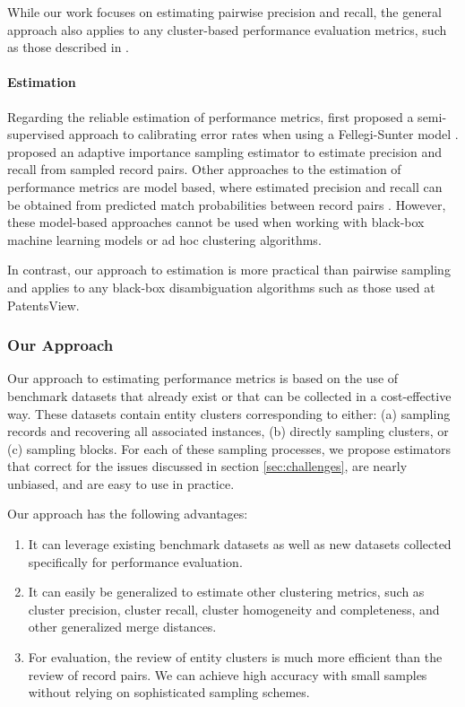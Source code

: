 \documentclass[fontsize=11pt]{article}
\theoremstyle{definition}
\begin{document}
{While our work focuses on estimating pairwise precision and recall, the general approach also applies to any cluster-based performance evaluation metrics, such as those described in \cite{Michelson2009}.}

\paragraph{Estimation}

Regarding the reliable estimation of performance metrics, \cite{Belin1995} first proposed a semi-supervised approach to calibrating error rates when using a Fellegi-Sunter model \citep{fellegi_theory_1969}. \cite{Marchant2017} proposed an adaptive importance sampling estimator to estimate precision and recall from sampled record pairs. Other approaches to the estimation of performance metrics are model based, where estimated precision and recall can be obtained from predicted match probabilities between record pairs \citep{enamorado2019using}. However, these model-based approaches cannot be used when working with black-box machine learning models or ad hoc clustering algorithms.

{In contrast, our approach to estimation is more practical than pairwise sampling and applies to any black-box disambiguation algorithms such as those used at PatentsView.}

\subsubsection{Our Approach}\label{sec:approach}

Our approach to estimating performance metrics is based on the use of benchmark datasets that already exist or that can be collected in a cost-effective way. These datasets contain entity clusters corresponding to either: (a) sampling records and recovering all associated instances, (b) directly sampling clusters, or (c) sampling blocks. For each of these sampling processes, we propose estimators that correct for the issues discussed in section \ref{sec:challenges}, are nearly unbiased, and are easy to use in practice.

Our approach has the following advantages:
\begin{enumerate}
    \item It can leverage existing benchmark datasets as well as new datasets collected specifically for performance evaluation.
    \item It can easily be generalized to estimate other clustering metrics, such as cluster precision, cluster recall, cluster homogeneity and completeness, and other generalized merge distances.
    \item For evaluation, the review of entity clusters is much more efficient than the review of record pairs. We can achieve high accuracy with small samples without relying on sophisticated sampling schemes.
\end{enumerate}
\end{document}
